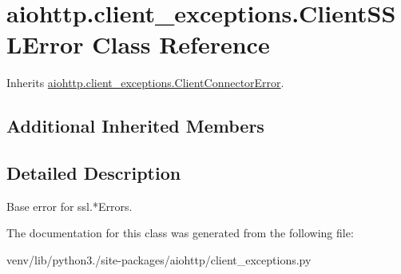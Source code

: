 \hypertarget{classaiohttp_1_1client__exceptions_1_1_client_s_s_l_error}{}\section{aiohttp.\+client\+\_\+exceptions.\+Client\+S\+S\+L\+Error Class Reference}
\label{classaiohttp_1_1client__exceptions_1_1_client_s_s_l_error}


Inherits \hyperlink{classaiohttp_1_1client__exceptions_1_1_client_connector_error}{aiohttp.\+client\+\_\+exceptions.\+Client\+Connector\+Error}.

\subsection*{Additional Inherited Members}


\subsection{Detailed Description}
\begin{DoxyVerb}Base error for ssl.*Errors.\end{DoxyVerb}
 

The documentation for this class was generated from the following file\+:\begin{DoxyCompactItemize}
\item 
venv/lib/python3./site-\/packages/aiohttp/client\+\_\+exceptions.\+py\end{DoxyCompactItemize}
